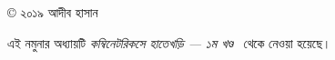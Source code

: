 \thispagestyle{empty}
\maketitle
\vspace*{\fill}
\begin{center}
  © ২০১৯ আদীব হাসান
  \par\medskip
  {\small এই নমুনার অধ্যায়টি \emph{কম্বিনেটরিকসে হাতেখড়ি — ১ম খণ্ড}~\cite{hatekhori2019}
  থেকে নেওয়া হয়েছে।}
\end{center}
\clearpage

